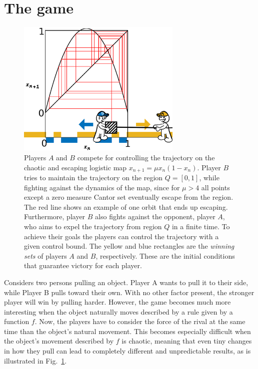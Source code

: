 \section{The game}


\begin{figure}
    \centering
    \includegraphics[width=0.7\textwidth]{Images/P5/drawing.png}
    \caption{Players $A$ and $B$ compete for controlling the trajectory on the chaotic and escaping logistic map $x_{n+1} = \mu x_n(1-x_n)$. Player $B$ tries to maintain the trajectory on the region $Q = [0,1]$, while fighting against the dynamics of the map, since for $\mu > 4$ all points except a zero measure Cantor set eventually escape from the region. The red line shows an example of one orbit that ends up escaping. Furthermore, player $B$ also fights against the opponent, player $A$, who aims to expel the trajectory from region $Q$ in a finite time. To achieve their goals the players can control the trajectory with a given control bound. The yellow and blue rectangles are the \textit{winning sets} of players $A$ and $B$, respectively. These are the initial conditions that guarantee victory for each player.}
    \label{fig:drawing}
\end{figure}





Considers two persons pulling an object. Player A wants to pull it to their side, while Player B
pulls toward their own. With no other factor present, the stronger player will
win by pulling harder. However, the game becomes much more interesting when the object naturally moves
described by a rule given by a function $f$. Now, the players have to consider the force of the rival at the same time than the object's natural movement. This becomes especially difficult when the object's movement described by $f$ is chaotic, meaning that even tiny changes in how they pull can lead to completely different and unpredictable results, as is illustrated in Fig.~\ref{fig:drawing}.


